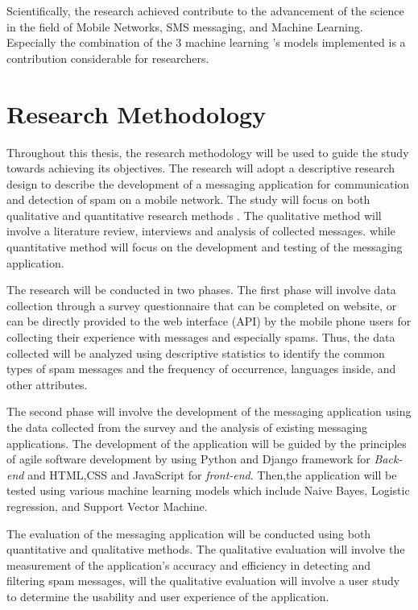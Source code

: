 \documentclass[12pt,a4paper]{report}
\begin{document}
	Scientifically, the research achieved contribute to the advancement of the science in the field of Mobile Networks, SMS messaging, and Machine Learning. Especially the combination of the 3 machine learning 's models implemented is a contribution considerable for researchers.
	
	\section{Research Methodology}
	Throughout this thesis, the research methodology will be used to guide the study towards achieving its objectives. The research will adopt a descriptive research design to describe the development of a messaging application for communication and detection of spam on a mobile network. The study will focus on both qualitative and quantitative research methods \cite{creswell2014research}. The qualitative method will involve a literature review, interviews and analysis of collected messages. while quantitative method will focus on the development and testing of the messaging application.
	
	The research will be conducted in two phases. The first phase will involve data collection through a survey questionnaire that can be completed on website, or can be directly provided to the web interface (API) by the mobile phone users for collecting their experience with messages and especially spams. Thus, the data collected will be analyzed using descriptive statistics \cite{bluman2017elementary} to identify the common types of spam messages and the frequency of occurrence, languages inside, and other attributes.  
	
	The second phase will involve the development of the messaging application using the data collected from the survey and the analysis of existing messaging applications. The development of the application will be guided by the principles of agile software development by using Python and Django framework for \textit{Back-end} and HTML,CSS and JavaScript for \textit{front-end}. Then,the application will be tested using various machine learning models which include Naive Bayes, Logistic regression, and Support Vector Machine.
	
	The evaluation of the messaging application will be conducted using both quantitative and qualitative methods. The qualitative evaluation will involve the measurement of the application's accuracy and efficiency in detecting and filtering spam messages, will the qualitative evaluation will involve a user study to determine the usability and user experience of the application.
	
	
	
	
	
	
	
	
	
	
	
	\newpage	
	
	
	
	
	
	
	
\end{document}
